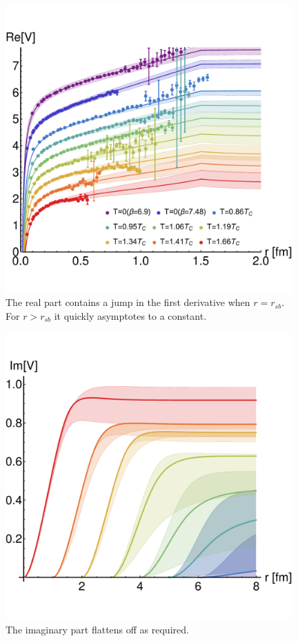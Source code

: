 \documentclass[12pt,a4paper]{article}
\newcommand{\rsb}{r_{sb}}
\begin{document}
\begin{figure}[h]
	\centering
	\includegraphics[width=11cm]{Debye_fitting3} 
	\caption{The real part contains a jump in the first derivative when \(r=\rsb\). For \(r>\rsb\) it quickly asymptotes to a constant.}    	
	\label{fig:ReVfit}
\end{figure}
\begin{figure}[h]
	\centering
	\includegraphics[width=11cm]{Debye_fitting1} 
	\caption{The imaginary part flattens off as required.}    	
	\label{fig:ImVfit}
\end{figure}



\end{document}
